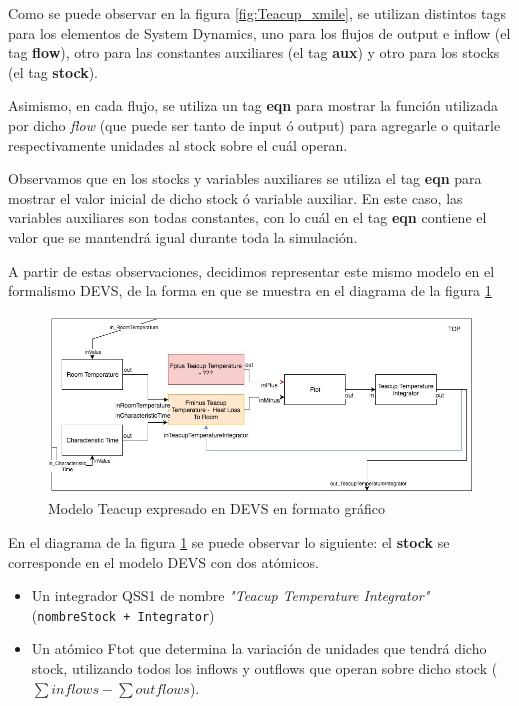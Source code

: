 Como se puede observar en la figura \ref{fig:Teacup_xmile}, se utilizan distintos tags para los elementos de System Dynamics, uno para los flujos de output e inflow (el tag \textbf{flow}), otro para las constantes auxiliares (el tag \textbf{aux}) y otro para los stocks (el tag \textbf{stock}). 

Asimismo, en cada flujo, se utiliza un tag \textbf{eqn} para mostrar la función utilizada por dicho \textit{flow} (que puede ser tanto de input ó output) para agregarle o quitarle respectivamente unidades al stock sobre el cuál operan. 

Observamos que en los stocks y variables auxiliares se utiliza el tag \textbf{eqn} para mostrar el valor inicial de dicho stock ó variable auxiliar. En este caso, las variables auxiliares son todas constantes, con lo cuál en el tag \textbf{eqn} contiene el valor que se mantendrá igual durante toda la simulación.

A partir de estas observaciones, decidimos representar este mismo modelo en el formalismo DEVS, de la forma en que se muestra en el diagrama de la figura \ref{fig:Teacup_devs_flattened}

\begin{figure}[!h]
\centering
\includegraphics[scale=0.5]{imagenes/Teacup_devs_flattened}
\caption{Modelo Teacup expresado en DEVS en formato gráfico}
\label{fig:Teacup_devs_flattened}
\end{figure}

En el diagrama de la figura \ref{fig:Teacup_devs_flattened} se puede observar lo siguiente: el \textbf{stock} se corresponde en el modelo DEVS con dos atómicos.

\begin{itemize}
	\item Un integrador QSS1 de nombre \textit{"Teacup Temperature Integrator"} (\texttt{nombreStock + Integrator})
	\item Un atómico Ftot que determina la variación de unidades que tendrá dicho stock, utilizando todos los inflows y outflows que operan sobre dicho stock ($\sum inflows - \sum outflows $). 
\end{itemize}


